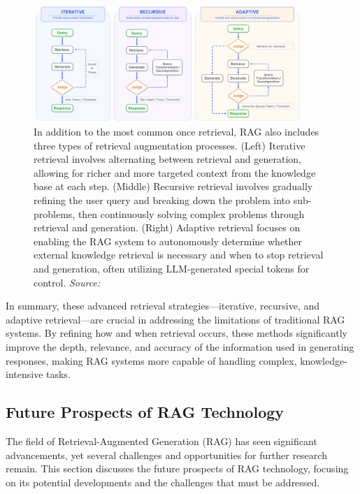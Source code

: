\begin{figure}[h]
    \centering
    \includegraphics[width=0.9\textwidth]{images/llms/augmentation-process.png}
    \caption{In addition to the most common once retrieval, RAG also includes three types of retrieval augmentation processes. (Left) Iterative retrieval involves alternating between retrieval and generation, allowing for richer and more targeted context from the knowledge base at each step. (Middle) Recursive retrieval involves gradually refining the user query and breaking down the problem into sub-problems, then continuously solving complex problems through retrieval and generation. (Right) Adaptive retrieval focuses on enabling the RAG system to autonomously determine whether external knowledge retrieval is necessary and when to stop retrieval and generation, often utilizing LLM-generated special tokens for control. \textit{Source:} \cite{gao2023retrieval}}
    \label{fig:rag_augmentation}
\end{figure}

In summary, these advanced retrieval strategies—iterative, recursive, and adaptive retrieval—are crucial in addressing the limitations of traditional RAG systems. By refining how and when retrieval occurs, these methods significantly improve the depth, relevance, and accuracy of the information used in generating responses, making RAG systems more capable of handling complex, knowledge-intensive tasks.

\subsection{Future Prospects of RAG Technology}

The field of Retrieval-Augmented Generation (RAG) has seen significant advancements, yet several challenges and opportunities for further research remain. This section discusses the future prospects of RAG technology, focusing on its potential developments and the challenges that must be addressed.


